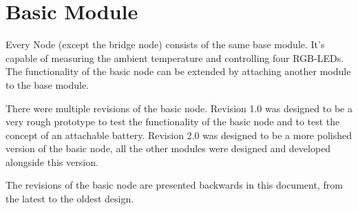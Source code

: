 \section{Basic Module}
Every Node (except the bridge node) consists of the same base module. It's
capable of measuring the ambient temperature and controlling four RGB-LEDs.
The functionality of the basic node can be extended by attaching another
module to the base module. 

There were multiple revisions of the basic node. Revision 1.0 was designed to
be a very rough prototype to test the functionality of the basic node and to 
test the concept of an attachable battery. Revision 2.0 was designed to be a 
more polished version of the basic node, all the other modules were designed 
and developed alongside this version.

The revisions of the basic node are presented backwards in this document, from
the latest to the oldest design.





